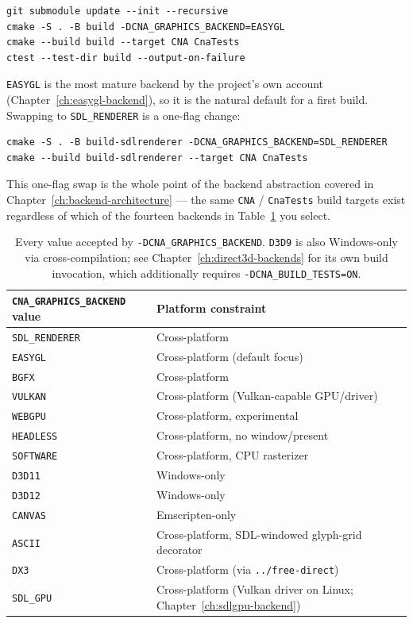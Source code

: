 \begin{lstlisting}[style=cnashell]
git submodule update --init --recursive
cmake -S . -B build -DCNA_GRAPHICS_BACKEND=EASYGL
cmake --build build --target CNA CnaTests
ctest --test-dir build --output-on-failure
\end{lstlisting}

\texttt{EASYGL} is the most mature backend by the project's own account (Chapter~\ref{ch:easygl-backend}),
so it is the natural default for a first build. Swapping to \texttt{SDL\_RENDERER} is a
one-flag change:

\begin{lstlisting}[style=cnashell]
cmake -S . -B build-sdlrenderer -DCNA_GRAPHICS_BACKEND=SDL_RENDERER
cmake --build build-sdlrenderer --target CNA CnaTests
\end{lstlisting}

This one-flag swap is the whole point of the backend abstraction covered in
Chapter~\ref{ch:backend-architecture} --- the same \texttt{CNA} / \texttt{CnaTests} build
targets exist regardless of which of the fourteen backends in
Table~\ref{tab:backend-option-list} you select.

\begin{table}[h]
\centering
\begin{tabular}{ll}
\toprule
\textbf{\texttt{CNA\_GRAPHICS\_BACKEND} value} & \textbf{Platform constraint} \\
\midrule
\texttt{SDL\_RENDERER} & Cross-platform \\
\texttt{EASYGL}        & Cross-platform (default focus) \\
\texttt{BGFX}          & Cross-platform \\
\texttt{VULKAN}        & Cross-platform (Vulkan-capable GPU/driver) \\
\texttt{WEBGPU}        & Cross-platform, experimental \\
\texttt{HEADLESS}      & Cross-platform, no window/present \\
\texttt{SOFTWARE}      & Cross-platform, CPU rasterizer \\
\texttt{D3D11}         & Windows-only \\
\texttt{D3D12}         & Windows-only \\
\texttt{CANVAS}        & Emscripten-only \\
\texttt{ASCII}         & Cross-platform, SDL-windowed glyph-grid decorator \\
\texttt{DX3}           & Cross-platform (via \texttt{../free-direct}) \\
\texttt{SDL\_GPU}      & Cross-platform (Vulkan driver on Linux; Chapter~\ref{ch:sdlgpu-backend}) \\
\bottomrule
\end{tabular}
\caption{Every value accepted by \texttt{-DCNA\_GRAPHICS\_BACKEND}. \texttt{D3D9} is also
Windows-only via cross-compilation; see Chapter~\ref{ch:direct3d-backends} for its own build
invocation, which additionally requires \texttt{-DCNA\_BUILD\_TESTS=ON}.}
\label{tab:backend-option-list}
\end{table}

